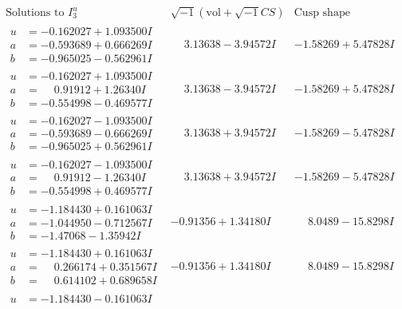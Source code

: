 \documentclass[1p]{elsarticle_modified}
\theoremstyle{definition}
\newcommand{\I}{\sqrt{-1}}
\begin{document}
$$\begin{array}{c|c|c}  
\text{Solutions to }I^u_{3}& \I (\text{vol} + \sqrt{-1}CS) & \text{Cusp shape}\\
 \hline 
\begin{aligned}
u &= -0.162027 + 1.093500 I \\
a &= -0.593689 + 0.666269 I \\
b &= -0.965025 - 0.562961 I\end{aligned}
 & \phantom{-}3.13638 - 3.94572 I & -1.58269 + 5.47828 I \\ \hline\begin{aligned}
u &= -0.162027 + 1.093500 I \\
a &= \phantom{-}0.91912 + 1.26340 I \\
b &= -0.554998 - 0.469577 I\end{aligned}
 & \phantom{-}3.13638 - 3.94572 I & -1.58269 + 5.47828 I \\ \hline\begin{aligned}
u &= -0.162027 - 1.093500 I \\
a &= -0.593689 - 0.666269 I \\
b &= -0.965025 + 0.562961 I\end{aligned}
 & \phantom{-}3.13638 + 3.94572 I & -1.58269 - 5.47828 I \\ \hline\begin{aligned}
u &= -0.162027 - 1.093500 I \\
a &= \phantom{-}0.91912 - 1.26340 I \\
b &= -0.554998 + 0.469577 I\end{aligned}
 & \phantom{-}3.13638 + 3.94572 I & -1.58269 - 5.47828 I \\ \hline\begin{aligned}
u &= -1.184430 + 0.161063 I \\
a &= -1.044950 - 0.712567 I \\
b &= -1.47068 - 1.35942 I\end{aligned}
 & -0.91356 + 1.34180 I & \phantom{-}8.0489 - 15.8298 I \\ \hline\begin{aligned}
u &= -1.184430 + 0.161063 I \\
a &= \phantom{-}0.266174 + 0.351567 I \\
b &= \phantom{-}0.614102 + 0.689658 I\end{aligned}
 & -0.91356 + 1.34180 I & \phantom{-}8.0489 - 15.8298 I \\ \hline\begin{aligned}
u &= -1.184430 - 0.161063 I \\

\end{aligned}
\end{array}$$
\end{document}
